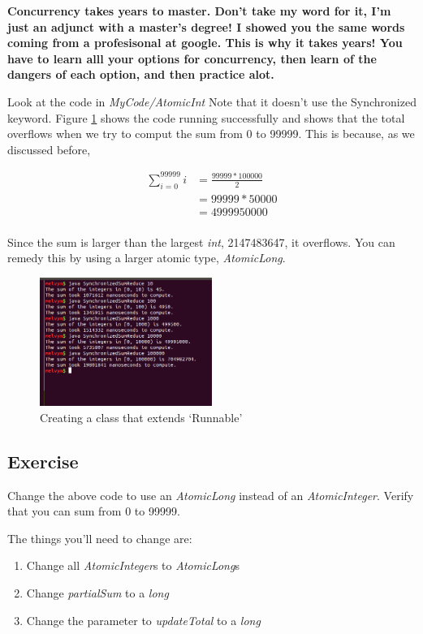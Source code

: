 \documentclass[12pt]{article}
\begin{document}
\begin{center}
{\Large\textbf{Concurrency takes years to master. Don't take my word for it, I'm
just an adjunct with a master's degree! I showed you the same words coming from
a profesisonal at google. This is why it takes years! You have to learn alll
your options for concurrency, then learn of the dangers of each option, and then
practice alot.}}
\end{center} 
Look at the code in \textit{MyCode/AtomicInt}
Note that it doesn't use the Synchronized keyword. Figure \ref{atomicInt} shows
the code running successfully and shows that the total overflows when we try to
comput the sum from 0 to 99999. This is because, as we discussed before, 

\begin{align*}
\sum_{i=0}^{99999}i &= \frac{99999*100000}{2}\\
					&= 99999 * 50000\\
					&= 4999950000\\
\end{align*}

Since the sum is larger than the largest \textit{int}, 2147483647, it overflows.
You can remedy this by using a larger atomic type, \textit{AtomicLong}.

\begin{figure}[ht]
  \label{atomicInt}
  \centering
    \includegraphics[width=0.5\textwidth]{Images/atomicOverflow.png}
  \caption{Creating a class that extends `Runnable'}
\end{figure}



\subsection{Exercise}
Change the above code to use an \textit{AtomicLong} instead of an
\textit{AtomicInteger}. Verify that you can sum from 0 to 99999.

The things you'll need to change are:
\begin{enumerate}
\item Change all \textit{AtomicInteger}s to \textit{AtomicLong}s
\item Change \textit{partialSum} to a \textit{long}
\item Change the parameter to \textit{updateTotal} to a \textit{long}
\end{enumerate}
\end{document}
